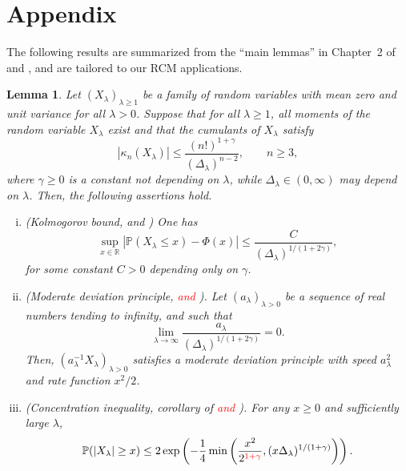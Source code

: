 \documentclass[12pt]{article}
\newcommand{\R}{\mathbb{R}}
\newcommand{\IP}{\mathbb{P}}
\newtheorem{lemma}[prop]{Lemma}
\numberwithin{equation}{section}
\begin{document}
\appendix

\section{Appendix}
\noindent 
The following results are summarized from the ``main lemmas'' in Chapter~2 of \cite{saulis} and \cite{doring}, and are tailored to our RCM applications.
\begin{lemma}
  \label{l1}
  Let $(X_\lambda)_{\lambda \geq 1}$ be a family of random variables with mean zero and unit variance for all $\lambda>0$. Suppose that for all $\lambda \geq 1$, all moments of the random variable $X_\lambda$ exist and that %
  the cumulants of $X_\lambda$ satisfy  
  \begin{equation}
    \label{Statuleviciuscond2}
    |\kappa_n (X_\lambda)|\le\frac{(n!)^{1+\gamma}}{(\Delta_\lambda)^{n-2}},
    \qquad
 n\ge3, 
\end{equation}
  where $\gamma\ge0$ is a constant not depending on $\lambda$, while $\Delta_\lambda\in(0,\infty)$ may depend on $\lambda$.
   Then, the following assertions hold.
\begin{enumerate}[i)]
\item (Kolmogorov bound,
 \cite[Corollary~2.1]{saulis} and \cite[Theorem~2.4]{doering})
  One has
\begin{equation}
\sup_{x\in\R}|\IP(X_\lambda\leq x)-\Phi(x)|\leq \frac{C}{(\Delta_\lambda)^{1/(1+2\gamma)}},
\end{equation}
for some constant $C>0$ depending only on $\gamma$.
\item (Moderate deviation principle,
  \cite[Theorem~1.1]{doring} \textcolor{red}{and \cite[Theorem~3.1]{doering}}).
  Let $( a_\lambda )_{\lambda > 0}$ be a sequence of real numbers tending to infinity, and such that 
  $$
  \lim_{\lambda \to \infty}
  \frac{a_\lambda}{(\Delta_\lambda)^{1/(1+2\gamma)}}
  = 0.
  $$
  Then, $ (a_\lambda^{-1}X_\lambda)_{\lambda >0}$ satisfies a moderate deviation principle with speed $a_\lambda^2$ and rate function $x^2/2$. 
\item (Concentration inequality,
  corollary of \cite[Lemma~2.4]{saulis} \textcolor{red}{and \cite[Theorem~2.5]{doering}}).
  For any $x\ge0$ and sufficiently large $\lambda$, 
\begin{equation}
\IP(|X_\lambda|\geq x)\le2\exp\left(-\frac14\min\left( \frac{x^2}{2^{\textcolor{red}{1+\gamma}}},(x\Delta_\lambda)^{1/(1+\gamma)}\right) \right).

\end{equation}
\end{enumerate}
\end{lemma}
\end{document}
